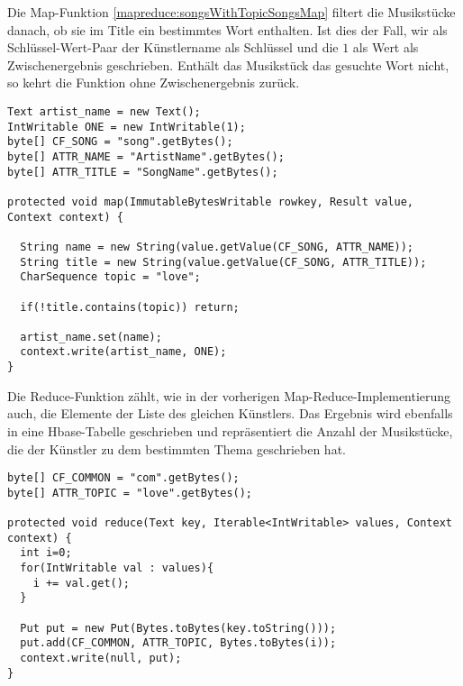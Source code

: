 Die Map-Funktion \ref{mapreduce:songsWithTopicSongsMap} filtert die Musikstücke danach, ob sie im Title ein bestimmtes Wort enthalten.
Ist dies der Fall, wir als Schlüssel-Wert-Paar der Künstlername als Schlüssel und die $1$ als 
Wert als Zwischenergebnis geschrieben. Enthält das Musikstück das gesuchte Wort nicht,
so kehrt die Funktion ohne Zwischenergebnis zurück.

\begin{lstlisting}[caption={Map-Funktion zur Suche nach Musikstücken eines Themas}, label=mapreduce:songsWithTopicSongsMap]
Text artist_name = new Text();
IntWritable ONE = new IntWritable(1);
byte[] CF_SONG = "song".getBytes();
byte[] ATTR_NAME = "ArtistName".getBytes();
byte[] ATTR_TITLE = "SongName".getBytes();
        
protected void map(ImmutableBytesWritable rowkey, Result value, Context context) {
            
  String name = new String(value.getValue(CF_SONG, ATTR_NAME));
  String title = new String(value.getValue(CF_SONG, ATTR_TITLE));          
  CharSequence topic = "love";
            
  if(!title.contains(topic)) return;
            
  artist_name.set(name);
  context.write(artist_name, ONE);
}
\end{lstlisting}

Die Reduce-Funktion zählt, wie in der vorherigen Map-Reduce-Implementierung auch, die Elemente der Liste des gleichen Künstlers.
Das Ergebnis wird ebenfalls in eine Hbase-Tabelle geschrieben und repräsentiert die Anzahl der Musikstücke, die der
Künstler zu dem bestimmten Thema geschrieben hat.

\begin{lstlisting}[caption={Reduce-Funktion zur Suche nach Musikstücken eines Themas}, label=mapreduce:songsWithTopicSongsReduce]
byte[] CF_COMMON = "com".getBytes();
byte[] ATTR_TOPIC = "love".getBytes();

protected void reduce(Text key, Iterable<IntWritable> values, Context context) {
  int i=0;
  for(IntWritable val : values){
    i += val.get();
  }
            
  Put put = new Put(Bytes.toBytes(key.toString()));
  put.add(CF_COMMON, ATTR_TOPIC, Bytes.toBytes(i));
  context.write(null, put);
}
\end{lstlisting}


